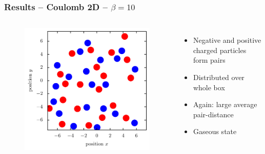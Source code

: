 \documentclass[mathserif,serif]{beamer}
\begin{document}
\begin{frame}
	\frametitle{Results -- Coulomb 2D -- $\beta=10$}
	\centering
	\begin{columns}	
	\begin{figure}
	\includegraphics[width=\textwidth]{../report/figures/Gas_1_beta_10.pdf}
	\end{figure}
	\begin{itemize}
	\item Negative and positive charged particles form pairs
	\item Distributed over whole box
	\item Again: large average pair-distance
	\item Gaseous state
	\end{itemize}
\end{columns}
\end{frame}
\end{document}
